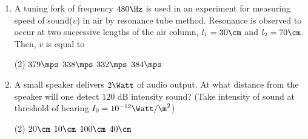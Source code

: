 \documentclass{article}
\begin{document}
\begin{enumerate}
\item A tuning fork of frequency $480\Hz$ is used in an experiment for measuring speed of sound($v$) in air by resonance tube method. Resonance is observed to occur at two successive lengths of the air column, $l_1=30\cm$ and $l_2=70\cm$. Then, $v$ is equal to
	\begin{tasks}(2)
		\task $379\mps$
		\task $338\mps$
		\task $332\mps$
		\task $384\mps$\ans
	\end{tasks}

\item A small speaker delivers $2\Watt$ of audio output. At what distance from the speaker will one detect $120\text{ dB}$ intensity sound? (Take intensity of sound at threshold of hearing $I_0=10^{-12}\Watt/\m^2$)
	\begin{tasks}(2)
		\task $20\cm$
		\task $10\cm$
		\task $100\cm$
		\task $40\cm$\ans
	\end{tasks}


\end{enumerate}
\end{document}
